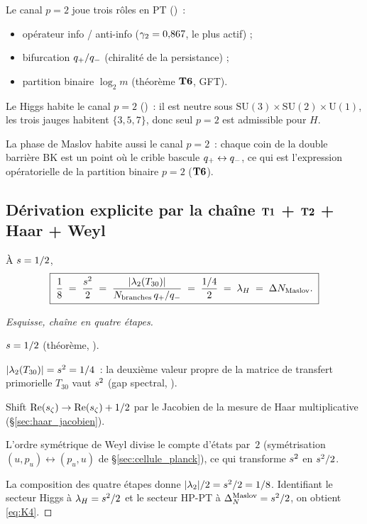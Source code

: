 Le canal $p = 2$ joue trois rôles en PT (\cite{PT_M1})~:
\begin{itemize}[nosep,leftmargin=*]
\item opérateur info / anti-info ($\gamma_{2} = 0{,}867$, le plus actif) ;
\item bifurcation $q_{+}/q_{-}$ (chiralité de la persistance) ;
\item partition binaire $\log_2 m$ (théorème $\textbf{T6}$, GFT).
\end{itemize}

Le Higgs habite le canal $p = 2$ (\cite{PT_M5})~:
il est neutre sous $\mathrm{SU}(3) \times \mathrm{SU}(2) \times \mathrm{U}(1)$,
les trois jauges habitent $\{3, 5, 7\}$, donc seul $p = 2$ est admissible
pour $H$.

La phase de Maslov habite aussi le canal $p = 2$~: chaque coin de la
double barrière BK est un point où le crible bascule
$q_{+} \leftrightarrow q_{-}$, ce qui est l'expression
opératorielle de la partition binaire $p = 2$ ($\textbf{T6}$).

\subsection{Dérivation explicite par la chaîne $\Tone$ + $\Ttwo$ + Haar + Weyl}
\label{sec:chaine_t1t2haarweyl}

\begin{theoreme}
\label{thm:chaine}
À $s = 1/2$,
\begin{equation}
\boxed{\;\dfrac{1}{8} \;=\; \dfrac{s^{2}}{2} \;=\; \dfrac{|\lambda_2(T_{30})|}{N_{\mathrm{branches}}\,q_{+}/q_{-}} \;=\; \dfrac{1/4}{2} \;=\; \lambda_H \;=\; \Delta N_{\mathrm{Maslov}}.\;}
\label{eq:K4}
\end{equation}
\end{theoreme}

\begin{proof}[Esquisse, chaîne en quatre étapes]
\begin{description}[nosep,leftmargin=*]
\item[$\Tone$.] $s = 1/2$ (théorème, \cite{PT_M1}).
\item[$\Ttwo$.] $|\lambda_2(T_{30})| = s^{2} = 1/4$~: la deuxième
valeur propre de la matrice de transfert primorielle $T_{30}$ vaut
$s^{2}$ (gap spectral, \cite{PT_M1}).
\item[Haar.] Shift $\operatorname{Re}(s_\zeta) \to \operatorname{Re}(s_\zeta) + 1/2$ par le
Jacobien de la mesure de Haar multiplicative
(\S\ref{sec:haar_jacobien}).
\item[Weyl.] L'ordre symétrique de Weyl divise le compte d'états par~$2$
(symétrisation $(u, p_u) \leftrightarrow (p_u, u)$ de
\S\ref{sec:cellule_planck}), ce qui transforme $s^{2}$ en
$s^{2}/2$.
\end{description}
La composition des quatre étapes donne $|\lambda_2|/2 = s^{2}/2 = 1/8$.
Identifiant le secteur Higgs à $\lambda_H = s^{2}/2$ et le secteur HP-PT
à $\Delta_N^{\mathrm{Maslov}} = s^{2}/2$, on obtient \eqref{eq:K4}.
\end{proof}

